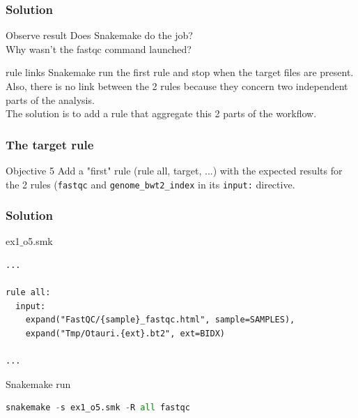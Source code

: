 \begin{frame}[containsverbatim]
\frametitle{Solution}
\begin{exampleblock}{Observe result}
Does Snakemake do the job?\\
Why wasn't the fastqc command launched?\\
\end{exampleblock}
\begin{exampleblock}{rule links}
Snakemake run the first rule and stop when the target files are present. Also, there is no link between the 2 rules because they concern two independent parts of the analysis.\\
The solution is to add a rule that aggregate this 2 parts of the workflow.
\end{exampleblock}
\end{frame}
\begin{frame}[containsverbatim]
\frametitle{The target rule}
\begin{exampleblock}{Objective 5}
Add a "first" rule (rule all, target, ...) with the expected results for the 2 rules (\verb|fastqc| and \verb|genome_bwt2_index| in its \verb|input:| directive.
\end{exampleblock}
\end{frame}
\begin{frame}[containsverbatim]
\frametitle{Solution}
\begin{exampleblock}{ex1$\_$o5.smk}
\begin{lstlisting}
...

rule all:
  input:
    expand("FastQC/{sample}_fastqc.html", sample=SAMPLES),
    expand("Tmp/Otauri.{ext}.bt2", ext=BIDX)

...
\end{lstlisting}
\end{exampleblock}
\begin{exampleblock}{Snakemake run}
\begin{lstlisting}[language=python]
snakemake -s ex1_o5.smk -R all fastqc
\end{lstlisting}
\end{exampleblock}
\end{frame}
